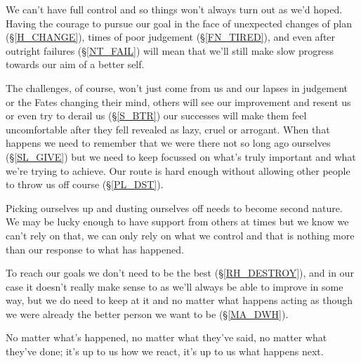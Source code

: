 \cleardoublepage
{\small

We can't have full control and so things won't always turn out as we'd hoped. Having the courage to pursue our goal in the face of unexpected changes of plan (\S \ref{H_CHANGE}), times of poor judgement (\S \ref{FN_TIRED}), and even after outright failures (\S \ref{NT_FAIL}) will mean that we'll still make slow progress towards our aim of a better self. 

The challenges, of course, won't just come from us and our lapses in judgement or the Fates changing their mind, others will see our improvement and resent us or even try to derail us (\S \ref{S_BTR}) our successes will make them feel uncomfortable after they fell revealed as lazy, cruel or arrogant. When that happens we need to remember that we were there not so long ago ourselves (\S \ref{SL_GIVE}) but we need to keep focussed on what's truly important and what we're trying to achieve. Our route is hard enough without allowing other people to throw us off course (\S \ref{PL_DST}).

Picking ourselves up and dusting ourselves off needs to become second nature. We may be lucky enough to have support from others at times but we know we can't rely on that, we can only rely on what we control and that is nothing more than our response to what has happened.

To reach our goals we don't need to be the best (\S \ref{RH_DESTROY}), and in our case it doesn't really make sense to  as we'll always be able to improve in some way, but we do need to keep at it and no matter what happens acting as though we were already the better person we want to be (\S \ref{MA_DWH}).

No matter what's happened, no matter what they've said, no matter what they've done; it's up to us how we react, it's up to us what happens next.

}
